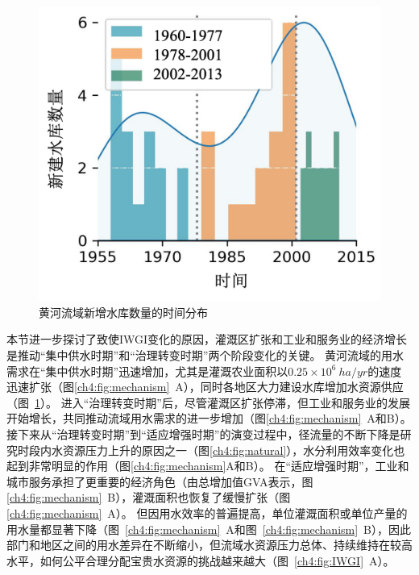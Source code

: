 \begin{figure}[tb]
    \centering
    \includegraphics[width=0.6\linewidth]{img/ch4/ch4_reservoirs.png}
    \caption{黄河流域新增水库数量的时间分布}\label{ch4:fig:reservoirs}
\end{figure}


本节进一步探讨了致使IWGI变化的原因，灌溉区扩张和工业和服务业的经济增长是推动“集中供水时期”和“治理转变时期”两个阶段变化的关键。
黄河流域的用水需求在“集中供水时期”迅速增加，尤其是灌溉农业面积以$0.25 \times 10^6~ha/yr$的速度迅速扩张（图\ref{ch4:fig:mechanism}~A），同时各地区大力建设水库增加水资源供应（图~\ref{ch4:fig:reservoirs}）。
进入“治理转变时期”后，尽管灌溉区扩张停滞，但工业和服务业的发展开始增长，共同推动流域用水需求的进一步增加（图\ref{ch4:fig:mechanism}~A和B）。
接下来从“治理转变时期”到“适应增强时期”的演变过程中，径流量的不断下降是研究时段内水资源压力上升的原因之一（图\ref{ch4:fig:natural}），水分利用效率变化也起到非常明显的作用（图\ref{ch4:fig:mechanism}A和B）。
在“适应增强时期”，工业和城市服务承担了更重要的经济角色（由总增加值GVA表示，图\ref{ch4:fig:mechanism}~B），灌溉面积也恢复了缓慢扩张（图\ref{ch4:fig:mechanism}~A）。
但因用水效率的普遍提高，单位灌溉面积或单位产量的用水量都显著下降（图~\ref{ch4:fig:mechanism}~A和图~\ref{ch4:fig:mechanism}~B），因此部门和地区之间的用水差异在不断缩小，但流域水资源压力总体、持续维持在较高水平，如何公平合理分配宝贵水资源的挑战越来越大（图~\ref{ch4:fig:IWGI}~A）。

